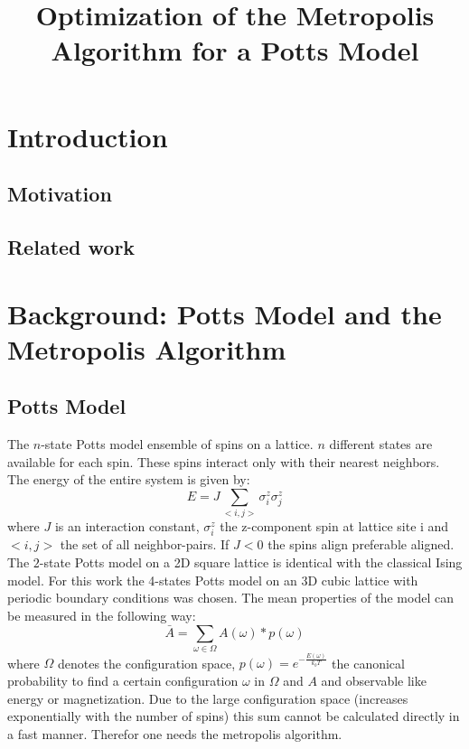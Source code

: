 \documentclass[letterpaper]{article}
\title{Optimization of the Metropolis Algorithm for a Potts Model}
\begin{document}
%
\maketitle
%


\begin{abstract}
\end{abstract}

\section{Introduction}\label{sec:intro}
\subsection{Motivation} 
\subsection{Related work}
\section{Background: Potts Model and the Metropolis Algorithm}\label{sec:background}
\subsection{Potts Model}
The $n$-state Potts model ensemble of spins on a lattice. $n$ different
states are available for each spin. These spins interact only with
their nearest neighbors. The energy of the entire system is given
by:
\[
E=J\sum_{<i,j>}\sigma_{i}^{z}\sigma_{j}^{z}
\]
where $J$ is an interaction constant, $\sigma_{i}^{z}$ the z-component
spin at lattice site i and $<i,j>$ the set of all neighbor-pairs.
If $J<0$ the spins align preferable aligned. The $2$-state Potts
model on a 2D square lattice is identical with the classical Ising
model. For this work the 4-states Potts model on an 3D cubic lattice
with periodic boundary conditions was chosen. The mean properties
of the model can be measured in the following way:
\[
\bar{A}=\sum_{\omega\in\Omega}A(\omega)*p(\omega)
\]
where $\Omega$ denotes the configuration space, $p(\omega)=e^{-\frac{E(\omega)}{k_{b}T}}$
the canonical probability to find a certain configuration $\omega$
in $\Omega$ and $A$ and observable like energy or magnetization.
Due to the large configuration space (increases exponentially with
the number of spins) this sum cannot be calculated directly in a fast
manner. Therefor one needs the metropolis algorithm.
\end{document}
